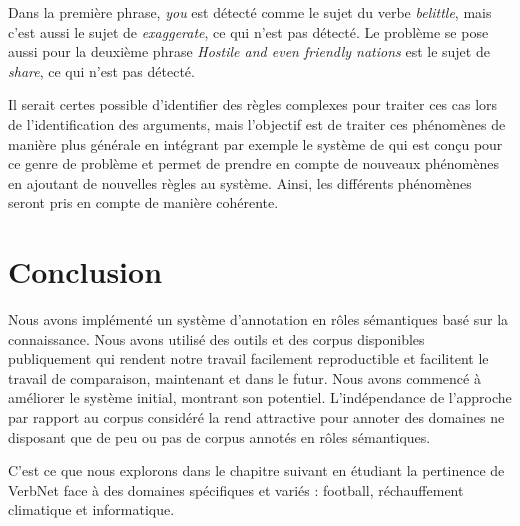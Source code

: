 Dans la première phrase, \textit{you} est détecté comme le sujet du verbe
\textit{belittle}, mais c'est aussi le sujet de \textit{exaggerate}, ce qui
n'est pas détecté. Le problème se pose aussi pour la deuxième phrase
\textit{Hostile and even friendly nations} est le sujet de \textit{share}, ce
qui n'est pas détecté.

Il serait certes possible d'identifier des règles complexes pour traiter ces
cas lors de l'identification des arguments, mais l'objectif est de traiter ces
phénomènes de manière plus générale en intégrant par exemple le système de
\cite{ribeyre2013systeme} qui est conçu pour ce genre de problème et permet de
prendre en compte de nouveaux phénomènes en ajoutant de nouvelles règles au
système. Ainsi, les différents phénomènes seront pris en compte de manière
cohérente.

\section*{Conclusion}

Nous avons implémenté un système d'annotation en rôles sémantiques basé sur la
connaissance. Nous avons utilisé des outils et des corpus disponibles
publiquement qui rendent notre travail facilement reproductible et facilitent
le travail de comparaison, maintenant et dans le futur. Nous avons commencé à
améliorer le système initial, montrant son potentiel. L'indépendance de
l'approche par rapport au corpus considéré la rend attractive pour annoter des
domaines ne disposant que de peu ou pas de corpus annotés en rôles sémantiques.

C'est ce que nous explorons dans le chapitre suivant en étudiant la pertinence
de VerbNet face à des domaines spécifiques et variés : football, réchauffement
climatique et informatique.

